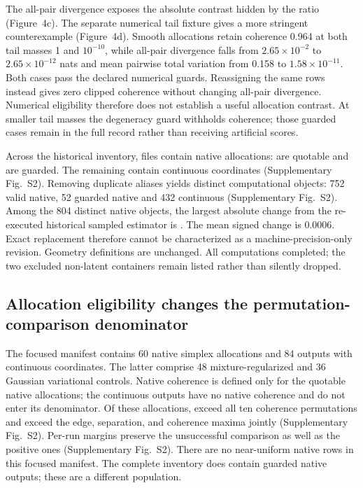\documentclass[11pt]{article}
\begin{document}
The all-pair divergence exposes the absolute contrast hidden by the ratio (Figure~4c). The separate numerical tail fixture gives a more stringent counterexample (Figure~4d). Smooth allocations retain coherence 0.964 at both tail masses 1 and $10^{-10}$, while all-pair divergence falls from $2.65\times10^{-2}$ to $2.65\times10^{-12}$ nats and mean pairwise total variation from 0.158 to $1.58\times10^{-11}$. Both cases pass the declared numerical guards. Reassigning the same rows instead gives zero clipped coherence without changing all-pair divergence. Numerical eligibility therefore does not establish a useful allocation contrast. At smaller tail masses the degeneracy guard withholds coherence; those guarded cases remain in the full record rather than receiving artificial scores.



Across the historical inventory, \NativeFiles{} files contain native allocations: \ValidNativeFiles{} are quotable and \GuardedNativeFiles{} are guarded. The remaining \NonNativeFiles{} contain continuous coordinates (Supplementary Fig.~S2). Removing duplicate aliases yields \UniqueScores{} distinct computational objects: 752 valid native, 52 guarded native and 432 continuous (Supplementary Fig.~S2). Among the 804 distinct native objects, the largest absolute change from the re-executed historical sampled estimator is \MaxExactDelta{}. The mean signed change is 0.0006. Exact replacement therefore cannot be characterized as a machine-precision-only revision. Geometry definitions are unchanged. All \UniqueScores{} computations completed; the two excluded non-latent containers remain listed rather than silently dropped.

\subsection{Allocation eligibility changes the permutation-comparison denominator}

The focused manifest contains 60 native simplex allocations and 84 outputs with continuous coordinates. The latter comprise 48 mixture-regularized and 36 Gaussian variational controls. Native coherence is defined only for the \NullEligible{} quotable native allocations; the continuous outputs have no native coherence and do not enter its denominator. Of these allocations, \NullCoherence{} exceed all ten coherence permutations and \NullJoint{} exceed the edge, separation, and coherence maxima jointly (Supplementary Fig.~S2). Per-run margins preserve the unsuccessful comparison as well as the positive ones (Supplementary Fig.~S2). There are no near-uniform native rows in this focused manifest. The complete inventory does contain guarded native outputs; these are a different population.
\end{document}
